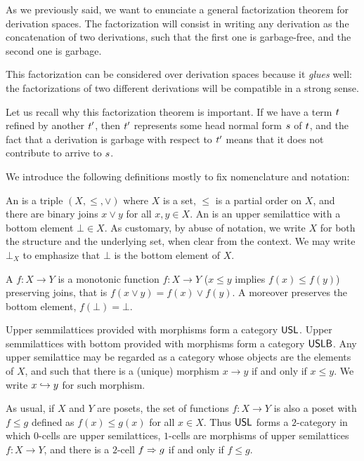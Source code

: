 
As we previously said, we want to enunciate a general
factorization theorem for derivation spaces.
The factorization will consist in writing any derivation as
the concatenation of two derivations, such that the first one is garbage-free,
and the second one is garbage.

This factorization can be considered over derivation spaces because
it \emph{glues} well: the factorizations of two different derivations will
be compatible in a strong sense.

Let us recall why this factorization theorem is important.
If we have a term $\tm$ refined by another $\tm'$, then
$\tm'$ represents some head normal form $\tmtwo$ of $\tm$,
and the fact that a derivation is garbage with respect to $\tm'$
means that it does not contribute to arrive to $\tmtwo$.


We introduce the following definitions mostly to fix nomenclature and notation:

\begin{definition}
An  is a triple $(X,\leq,\lor)$
where $X$ is a set, $\leq$ is a partial order on $X$,
and there are binary joins $x \lor y$ for all $x, y \in X$.
An  is an upper semilattice
with a bottom element $\bot \in X$.
As customary, by abuse of notation, we write $X$ for both the structure
and the underlying set, when clear from the context.
We may write $\bot_X$ to emphasize that $\bot$ is the bottom element of $X$.

A  $f : X \to Y$
is a monotonic function $f : X \to Y$
(\ie $x \leq y$ implies $f(x) \leq f(y)$)
preserving joins,
that is $f(x \lor y) = f(x) \lor f(y)$.
A 
moreover preserves the bottom element, \ie $f(\bot) = \bot$.

Upper semmilattices provided with morphisms form a category $\USL$.
Upper semmilattices with bottom provided with morphisms form a category $\USLB$.
Any upper semilattice may be regarded as a category
whose objects are the elements of $X$, and such that there is a (unique) morphism
$x \to y$ if and only if $x \leq y$.
We write $\pt{y}{x}$ for such morphism.

As usual, if $X$ and $Y$ are posets, the set of functions $f : X \to Y$
is also a poset with $f \leq g$ defined as $f(x) \leq g(x)$ for all $x \in X$.
Thus $\USL$ forms a $2$-category
in which $0$-cells are upper semilattices,
$1$-cells are morphisms of upper semilattices $f : X \to Y$, 
and there is a $2$-cell $f \totwo g$ if and only if $f \leq g$.
\end{definition}

